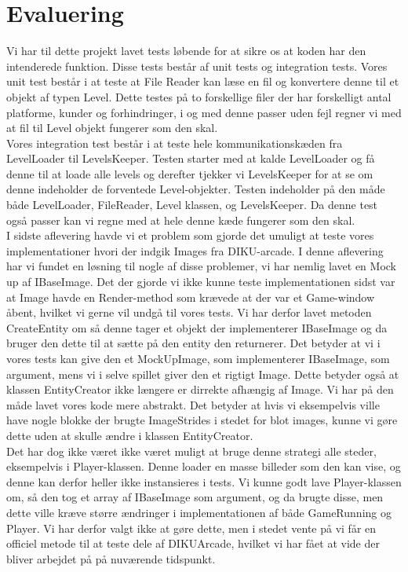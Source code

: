 \section{Evaluering}
Vi har til dette projekt lavet tests løbende for at sikre os at koden har den intenderede funktion. Disse tests består af unit tests og integration tests. Vores unit test består i at teste at File Reader kan læse en fil og konvertere denne til et objekt af typen Level. Dette testes på to forskellige filer der har forskelligt antal platforme, kunder og forhindringer, i og med denne passer uden fejl regner vi med at fil til Level objekt fungerer som den skal.\\
Vores integration test består i at teste hele kommunikationskæden fra LevelLoader til LevelsKeeper. Testen starter med at kalde LevelLoader og få denne til at loade alle levels og derefter tjekker vi LevelsKeeper for at se om denne indeholder de forventede Level-objekter. Testen indeholder på den måde både LevelLoader, FileReader, Level klassen, og LevelsKeeper. Da denne test også passer kan vi regne med at hele denne kæde fungerer som den skal.\\
I sidste aflevering havde vi et problem som gjorde det umuligt at teste vores implementationer hvori der indgik Images fra DIKU-arcade. I denne aflevering har vi fundet en løsning til nogle af disse problemer, vi har nemlig lavet en Mock up af IBaseImage. Det der gjorde vi ikke kunne teste implementationen sidst var at Image havde en Render-method som krævede at der var et Game-window åbent, hvilket vi gerne vil undgå til vores tests. Vi har derfor lavet metoden CreateEntity om så denne tager et objekt der implementerer IBaseImage og da bruger den dette til at sætte på den entity den returnerer. Det betyder at vi i vores tests kan give den et MockUpImage, som implementerer IBaseImage, som argument, mens vi i selve spillet giver den et rigtigt Image. Dette betyder også at klassen EntityCreator ikke længere er dirrekte afhængig af Image. Vi har på den måde lavet vores kode mere abstrakt. Det betyder at hvis vi eksempelvis ville have nogle blokke der brugte ImageStrides i stedet for blot images, kunne vi gøre dette uden at skulle ændre i klassen EntityCreator.\\
Det har dog ikke været ikke været muligt at bruge denne strategi alle steder, eksempelvis i Player-klassen. Denne loader en masse billeder som den kan vise, og denne kan derfor heller ikke instansieres i tests. Vi kunne godt lave Player-klassen om, så den tog et array af IBaseImage som argument, og da brugte disse, men dette ville kræve større ændringer i implementationen af både GameRunning og Player. Vi har derfor valgt ikke at gøre dette, men i stedet vente på vi får en officiel metode til at teste dele af DIKUArcade, hvilket vi har fået at vide der bliver arbejdet på på nuværende tidspunkt.
